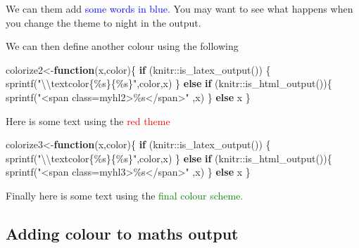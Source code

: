 \documentclass[
  letterpaper,
]{article}
\newenvironment{Shaded}{\begin{snugshade}}{\end{snugshade}}
\newcommand{\ControlFlowTok}[1]{\textcolor[rgb]{0.00,0.23,0.31}{\textbf{#1}}}
\newcommand{\FunctionTok}[1]{\textcolor[rgb]{0.28,0.35,0.67}{#1}}
\newcommand{\NormalTok}[1]{\textcolor[rgb]{0.00,0.23,0.31}{#1}}
\newcommand{\OtherTok}[1]{\textcolor[rgb]{0.00,0.23,0.31}{#1}}
\newcommand{\SpecialCharTok}[1]{\textcolor[rgb]{0.37,0.37,0.37}{#1}}
\newcommand{\StringTok}[1]{\textcolor[rgb]{0.13,0.47,0.30}{#1}}
\numberwithin{equation}{section}
\numberwithin{figure}{section}
\theoremstyle{break}
\begin{document}
We can them add \textcolor{blue}{some words in blue.} You may want to
see what happens when you change the theme to night in the output.

We can then define another colour using the following

\begin{Shaded}
\begin{Highlighting}[]
\NormalTok{colorize2}\OtherTok{\textless{}{-}}\ControlFlowTok{function}\NormalTok{(x,color)\{}
  \ControlFlowTok{if}\NormalTok{ (knitr}\SpecialCharTok{::}\FunctionTok{is\_latex\_output}\NormalTok{()) \{}
    \FunctionTok{sprintf}\NormalTok{(}\StringTok{"}\SpecialCharTok{\textbackslash{}\textbackslash{}}\StringTok{textcolor\{\%s\}\{\%s\}"}\NormalTok{,color,x)}
\NormalTok{  \} }\ControlFlowTok{else} \ControlFlowTok{if}\NormalTok{ (knitr}\SpecialCharTok{::}\FunctionTok{is\_html\_output}\NormalTok{())\{}
    \FunctionTok{sprintf}\NormalTok{(}\StringTok{"\textless{}span class=\textquotesingle{}myhl2\textquotesingle{}\textgreater{}\%s\textless{}/span\textgreater{}"}\NormalTok{ ,x)}
\NormalTok{  \} }\ControlFlowTok{else}\NormalTok{ x}
\NormalTok{\}}
\end{Highlighting}
\end{Shaded}

Here is some text using the \textcolor{red}{red theme}

\begin{Shaded}
\begin{Highlighting}[]
\NormalTok{colorize3}\OtherTok{\textless{}{-}}\ControlFlowTok{function}\NormalTok{(x,color)\{}
  \ControlFlowTok{if}\NormalTok{ (knitr}\SpecialCharTok{::}\FunctionTok{is\_latex\_output}\NormalTok{()) \{}
    \FunctionTok{sprintf}\NormalTok{(}\StringTok{"}\SpecialCharTok{\textbackslash{}\textbackslash{}}\StringTok{textcolor\{\%s\}\{\%s\}"}\NormalTok{,color,x)}
\NormalTok{  \} }\ControlFlowTok{else} \ControlFlowTok{if}\NormalTok{ (knitr}\SpecialCharTok{::}\FunctionTok{is\_html\_output}\NormalTok{())\{}
    \FunctionTok{sprintf}\NormalTok{(}\StringTok{"\textless{}span class=\textquotesingle{}myhl3\textquotesingle{}\textgreater{}\%s\textless{}/span\textgreater{}"}\NormalTok{ ,x)}
\NormalTok{  \} }\ControlFlowTok{else}\NormalTok{ x}
\NormalTok{\}}
\end{Highlighting}
\end{Shaded}

Finally here is some text using the
\textcolor{green}{final colour scheme.}

\subsection{Adding colour to maths
output}\label{adding-colour-to-maths-output}
\end{document}
